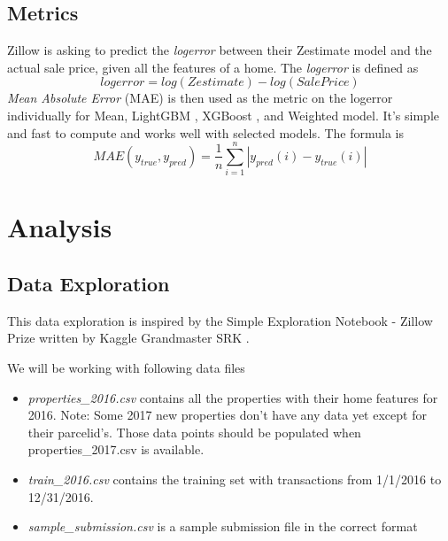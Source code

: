 \documentclass[a4paper]{article}
\begin{document}
\subsection{Metrics}
%
%
Zillow is asking to predict the \textit{logerror} between their Zestimate model and the
actual sale price, given all the features of a home. The \textit{logerror} is defined as
\[ logerror = log(Zestimate) - log(SalePrice) \]
\textit{Mean Absolute Error} (MAE) is then used as the metric on the logerror individually for Mean, LightGBM \cite{lightgbm}, XGBoost \cite{xgboost}, and Weighted model. It's simple and fast to compute and works well with selected models. The formula is 
\[ MAE(y_{true}, y_{pred}) = \frac{1}{n} \sum_{i=1}^{n} |y_{pred}(i) - y_{true}(i)| \]


\section{Analysis}

\subsection{Data Exploration}
This data exploration is inspired by the Simple Exploration Notebook - Zillow Prize \cite{datavis} written by Kaggle Grandmaster SRK \cite{srk}.

We will be working with following data files
\begin{itemize}
    \item \textit{properties\_2016.csv} contains all the properties with their home features for 2016. Note: Some 2017 new
    properties don't have any data yet except for their parcelid's. Those data points should be populated when
    properties\_2017.csv is available.
    \item \textit{train\_2016.csv} contains the training set with transactions from 1/1/2016 to 12/31/2016.
    \item \textit{sample\_submission.csv} is a sample submission file in the correct format
\end{itemize}
\end{document}
